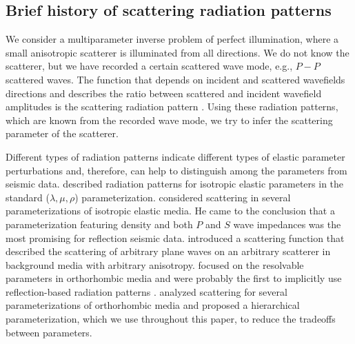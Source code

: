 \subsection{Brief history of scattering radiation patterns}

We consider a multiparameter inverse problem of perfect illumination, where a small anisotropic scatterer is illuminated from all directions. We do not know the scatterer, but we have recorded a certain scattered wave mode, e.g., $P-P$ scattered waves.
% 
The function that depends on incident and scattered wavefields directions and describes the ratio between scattered and incident wavefield amplitudes is the scattering radiation pattern \citep{wu1985,alkhalifah2014}. 
Using these radiation patterns, which are known from the recorded wave mode, we try to infer the scattering parameter of the scatterer.
%



%
%
%


Different types of radiation patterns indicate different types of elastic 
parameter perturbations and, therefore, can help to distinguish among the parameters from seismic data. \cite{wu1985} described radiation patterns for isotropic elastic 
parameters in the standard ($\lambda,\mu,\rho$) parameterization. 
%
\cite{tarantola1986} considered scattering in several parameterizations of 
isotropic elastic media. He came to the conclusion that a parameterization featuring density and both $P$ and $S$ wave impedances was the 
most promising for reflection seismic 
data. 
%
\cite{eaton1994} introduced a scattering function that 
described the scattering of arbitrary plane waves on an arbitrary scatterer in background media with arbitrary anisotropy. 
\cite{hoop1999} focused on the resolvable 
parameters in orthorhombic media and were probably the first to implicitly use 
reflection-based radiation patterns 
\citep{gholami20131,alkhalifah2014,kamath2016,plessix2016}. \cite{juwon2016} 
analyzed 
scattering for several parameterizations of orthorhombic media and proposed a 
hierarchical parameterization, which we use throughout this paper, to reduce the tradeoffs between parameters.